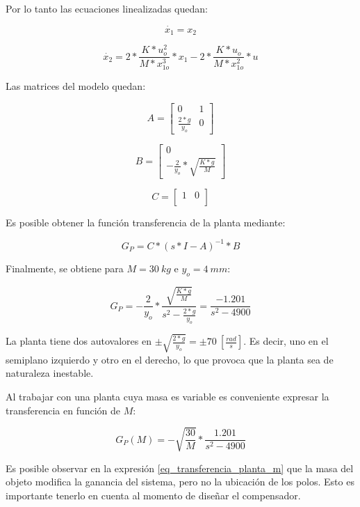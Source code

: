 \noindent Por lo tanto las ecuaciones linealizadas quedan:

\begin{equation}
	\dot{x_{1}}=x_{2}
\end{equation}

\begin{equation}
	\dot{x_{2}}=2*\frac{K*u_{o}^{2}}{M*x_{1o}^{3}}*x_{1}-2*\frac{K*u_{o}}{M*x_{1o}^{2}}*u
\end{equation}

\noindent Las matrices del modelo quedan:

\begin{equation}
	A=\begin{bmatrix}
		0 & 1\\
		\frac{2*g}{y_{o}} & 0
	\end{bmatrix}
\end{equation}

\begin{equation}
	B=\begin{bmatrix}
		0\\
		-\frac{2}{y_{o}}*\sqrt{\frac{K*g}{M}}
	\end{bmatrix}
\end{equation}

\begin{equation}
	C=\begin{bmatrix}
		1 & 0\\
	\end{bmatrix}
\end{equation}

\noindent Es posible obtener la función transferencia de la planta mediante:

\begin{equation}\label{eq_transferencia_planta}
	G_{P}=C*(s*I-A)^{-1}*B
\end{equation}

\noindent Finalmente, se obtiene para $M=30\:kg$ e $y_{o}=4\:mm$:

\begin{equation} \label{eq_transferencia_planta_30kg}
	G_{P}=-\frac{2}{y_{o}}*\frac{\sqrt{\frac{K*g}{M}}}{s^2-\frac{2*g}{y_{o}}}=\frac{-1.201}{s^{2}-4900}
\end{equation}

\noindent La planta tiene dos autovalores en $\pm\sqrt{\frac{2*g}{y_{o}}}=\pm70\:[\frac{rad}{s}]$. Es decir, uno en el semiplano izquierdo y otro en el derecho, lo que provoca que la planta sea de naturaleza inestable.

\noindent Al trabajar con una planta cuya masa es variable es conveniente expresar la transferencia en función de $M$:

\begin{equation} \label{eq_transferencia_planta_m}
		G_{P}(M)=-\sqrt{\frac{30}{M}}*\frac{1.201}{s^{2}-4900}
\end{equation}

\noindent Es posible observar en la expresión \ref{eq_transferencia_planta_m} que la masa del objeto modifica la ganancia del sistema, pero no la ubicación de los polos. Esto es importante tenerlo en cuenta al momento de diseñar el compensador.

